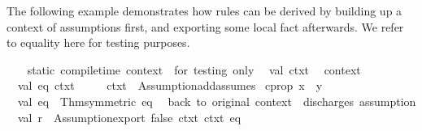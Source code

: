 \begin{isabellebody}
\begin{isamarkuptext}
\begin{description}
  \end{description}%
\end{isamarkuptext}%
\isamarkuptrue%
%
\endisatagmlref
{\isafoldmlref}%
%
\isadelimmlref
%
\endisadelimmlref
%
\isadelimmlex
%
\endisadelimmlex
%
\isatagmlex
%
\begin{isamarkuptext}%
The following example demonstrates how rules can be
  derived by building up a context of assumptions first, and exporting
  some local fact afterwards.  We refer to \hyperlink{theory.Pure}{\mbox{}} equality
  here for testing purposes.%
\end{isamarkuptext}%
\isamarkuptrue%
%
\endisatagmlex
{\isafoldmlex}%
%
\isadelimmlex
%
\endisadelimmlex
%
\isadelimML
%
\endisadelimML
%
\isatagML
{}\isamarkupfalse%
\ {}\isanewline
\ \ {}{}static\ compile{}time\ context\ {}{}\ for\ testing\ only{}{}\isanewline
\ \ val\ ctxt{}\ {}\ %
\isaantiq
context{}%
\endisaantiq
{}\isanewline
\isanewline
\ \ val\ {}{}eq{}{}\ ctxt{}{}\ {}\isanewline
\ \ \ \ ctxt{}\ {}{}\ Assumption{}add{}assumes\ {}%
\isaantiq
cprop\ {}x\ {}\ y{}{}%
\endisaantiq
{}{}\isanewline
\ \ val\ eq{}\ {}\ Thm{}symmetric\ eq{}\isanewline
\isanewline
\ \ {}{}back\ to\ original\ context\ {}{}\ discharges\ assumption{}{}\isanewline
\ \ val\ r\ {}\ Assumption{}export\ false\ ctxt{}\ ctxt{}\ eq{}{}\isanewline

\end{isabellebody}
